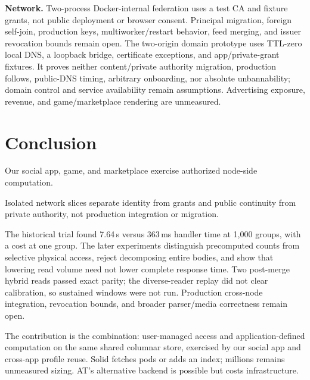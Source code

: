 \documentclass[sigconf, nonacm]{acmart}
\begin{document}
\textbf{Network.} Two-process Docker-internal federation uses a test CA and
fixture grants, not public deployment or browser consent. Principal
migration, foreign self-join, production keys, multiworker/restart behavior,
feed merging, and issuer revocation bounds remain open. The two-origin
domain prototype uses TTL-zero local DNS, a loopback bridge, certificate
exceptions, and app/private-grant fixtures. It proves neither content/private
authority migration, production follows, public-DNS timing, arbitrary
onboarding, nor absolute unbannability; domain control and service
availability remain assumptions. Advertising exposure, revenue, and
game/marketplace rendering are unmeasured.

\section{Conclusion}
\label{sec:conclusion}

Our social app, game, and marketplace exercise authorized node-side computation.

Isolated network slices separate identity from grants and public continuity
from private authority, not production integration or migration.

The historical trial found 7.64\,s versus 363\,ms handler time at 1,000
groups, with a cost at one group. The later experiments distinguish precomputed
counts from selective physical access, reject decomposing entire bodies, and
show that lowering read volume need not lower complete response time. Two
post-merge hybrid reads passed exact parity; the diverse-reader replay did not
clear calibration, so sustained windows were not run. Production cross-node integration, revocation
bounds, and broader parser/media correctness remain open.

The contribution is the combination: user-managed access and
application-defined computation on the same shared columnar store,
exercised by our social app and cross-app profile reuse. Solid fetches pods
or adds an index; millions remains unmeasured sizing. AT's alternative
backend is possible but costs infrastructure.



\end{document}

